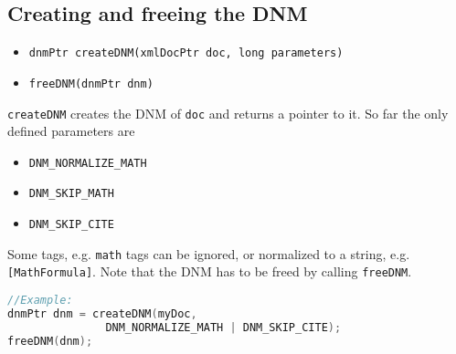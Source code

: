 \documentclass[12pt]{article}
\begin{document}
\subsection{Creating and freeing the DNM}
\begin{itemize}
\item \texttt{dnmPtr createDNM(xmlDocPtr doc, long parameters)}
\item \texttt{freeDNM(dnmPtr dnm)}
\end{itemize}
\texttt{createDNM} creates the DNM of \texttt{doc} and returns a pointer to it.
So far the only defined parameters are
\begin{itemize}
\item \texttt{DNM\_NORMALIZE\_MATH}
\item \texttt{DNM\_SKIP\_MATH}
\item \texttt{DNM\_SKIP\_CITE}
\end{itemize}
Some tags, e.g. \texttt{math} tags can be ignored, or normalized to a string, e.g. \texttt{[MathFormula]}.
Note that the DNM has to be freed by calling \texttt{freeDNM}.

\begin{lstlisting}[language=C]
//Example:
dnmPtr dnm = createDNM(myDoc,
               DNM_NORMALIZE_MATH | DNM_SKIP_CITE);
freeDNM(dnm);
\end{lstlisting}
\end{document}
